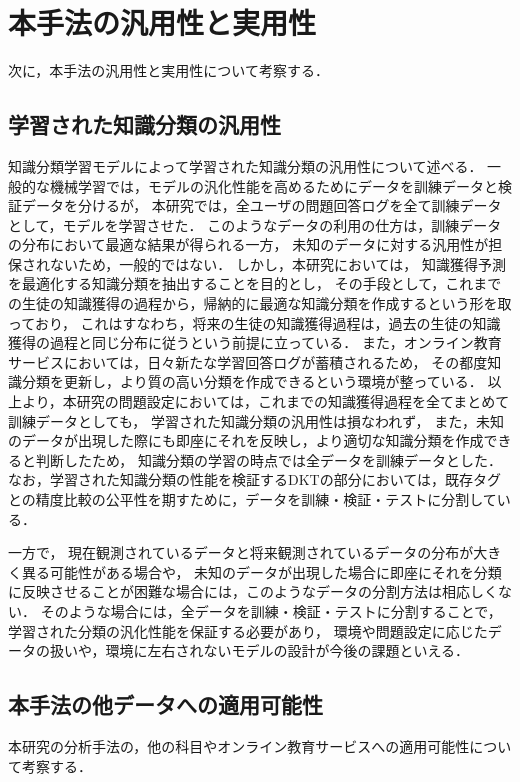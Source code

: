 \section{本手法の汎用性と実用性}
次に，本手法の汎用性と実用性について考察する．

\subsection{学習された知識分類の汎用性}
知識分類学習モデルによって学習された知識分類の汎用性について述べる．
一般的な機械学習では，モデルの汎化性能を高めるためにデータを訓練データと検証データを分けるが，
本研究では，全ユーザの問題回答ログを全て訓練データとして，モデルを学習させた．
このようなデータの利用の仕方は，訓練データの分布において最適な結果が得られる一方，
未知のデータに対する汎用性が担保されないため，一般的ではない．
しかし，本研究においては，
知識獲得予測を最適化する知識分類を抽出することを目的とし，
その手段として，これまでの生徒の知識獲得の過程から，帰納的に最適な知識分類を作成するという形を取っており，
これはすなわち，将来の生徒の知識獲得過程は，過去の生徒の知識獲得の過程と同じ分布に従うという前提に立っている．
また，オンライン教育サービスにおいては，日々新たな学習回答ログが蓄積されるため，
その都度知識分類を更新し，より質の高い分類を作成できるという環境が整っている．
以上より，本研究の問題設定においては，これまでの知識獲得過程を全てまとめて訓練データとしても，
学習された知識分類の汎用性は損なわれず，
また，未知のデータが出現した際にも即座にそれを反映し，より適切な知識分類を作成できると判断したため，
知識分類の学習の時点では全データを訓練データとした．
なお，学習された知識分類の性能を検証するDKTの部分においては，既存タグとの精度比較の公平性を期すために，データを訓練・検証・テストに分割している．

一方で，
現在観測されているデータと将来観測されているデータの分布が大きく異る可能性がある場合や，
未知のデータが出現した場合に即座にそれを分類に反映させることが困難な場合には，このようなデータの分割方法は相応しくない．
そのような場合には，全データを訓練・検証・テストに分割することで，
学習された分類の汎化性能を保証する必要があり，
環境や問題設定に応じたデータの扱いや，環境に左右されないモデルの設計が今後の課題といえる．


\subsection{本手法の他データへの適用可能性}
本研究の分析手法の，他の科目やオンライン教育サービスへの適用可能性について考察する．


